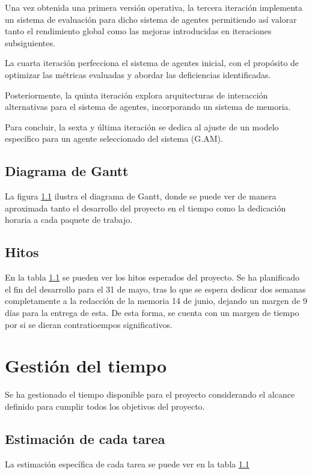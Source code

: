 Una vez obtenida una primera versión operativa, la tercera iteración implementa un sistema de evaluación para dicho sistema de agentes permitiendo así valorar tanto el rendimiento global como las mejoras introducidas en iteraciones subsiguientes. 

La cuarta iteración perfecciona el sistema de agentes inicial, con el propósito de optimizar las métricas evaluadas y abordar las deficiencias identificadas.

Posteriormente, la quinta iteración explora arquitecturas de interacción alternativas para el sistema de agentes, incorporando un sistema de memoria.

Para concluir, la sexta y última iteración se dedica al ajuste de un modelo específico para un agente seleccionado del sistema (G.AM).

\subsection{Diagrama de Gantt}

La figura \ref{} ilustra el diagrama de Gantt, donde se puede ver de manera aproximada tanto el desarrollo del proyecto en el tiempo como la dedicación horaria a cada paquete de trabajo.

\subsection{Hitos}

En la tabla \ref{} se pueden ver los hitos esperados del proyecto. Se ha planificado el fin del desarrollo para el 31 de mayo, tras lo que se espera dedicar dos semanas completamente a la redacción de la memoria 14 de junio, dejando un margen de 9 días para la entrega de esta. De esta forma, se cuenta con un margen de tiempo por si se dieran contratioempos significativos.  

\section{Gestión del tiempo}
Se ha gestionado el tiempo disponible para el proyecto considerando el alcance definido para cumplir todos los objetivos del proyecto. 

\subsection{Estimación de cada tarea}
La estimación específica de cada tarea se puede ver en la tabla \ref{}

